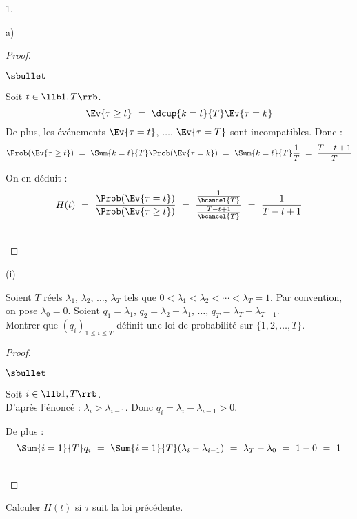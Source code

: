 \documentclass[11pt]{article}%
\begin{document}
\begin{noliste}{1.}
\begin{noliste}{a)}
\begin{proof}
\begin{noliste}{$\sbullet$}
	\item Soit $t\in \llb 1, T\rrb$.
	\[
	  \Ev{\tau \geq t} \ = \ \dcup{k=t}{T} \Ev{\tau =k}
	\]
	De plus, les événements $\Ev{\tau=t}$, $\ldots$, $\Ev{\tau =
	T}$ sont incompatibles. Donc :
	\[
	  \Prob(\Ev{\tau \geq t}) \ = \ \Sum{k=t}{T} 
	  \Prob(\Ev{\tau =k}) \ = \ \Sum{k=t}{T} \dfrac{1}{T}
	  \ = \ \dfrac{T-t+1}{T}
	\]
	
	\item On en déduit :
	\[
	  H(t) \ = \ \dfrac{\Prob(\Ev{\tau =t})}{\Prob(\Ev{\tau \geq 
	  t})} \ = \ \dfrac{\frac{1}{\bcancel{T}}}{\frac{T-t+1}
	  {\bcancel{T}}} \ = \ \dfrac{1}{T-t+1}
	\]
      \end{noliste}
      ~\\[-1cm]
    \end{proof}

    
    \item 
    \begin{nonoliste}{(i)}
      \item Soient $T$ réels $\lambda_1$, $\lambda_2$, $\ldots$, 
      $\lambda_T$ tels que $0 < \lambda_1 < \lambda_2 < \cdots < 
      \lambda_T=1$. Par convention, on pose $\lambda_0=0$. Soient 
      $q_1=\lambda_1$, $q_2=\lambda_2-\lambda_1$, $\ldots$, 
      $q_T=\lambda_T - \lambda_{T-1}$.\\
      Montrer que $(q_i)_{1\leq i \leq T}$ définit une loi de 
      probabilité sur $\{1,2, \ldots, T\}$.
      
      \begin{proof}~
        \begin{noliste}{$\sbullet$}
	  \item Soit $i\in \llb 1, T\rrb$.\\
	  D'après l'énoncé : $\lambda_i > \lambda_{i-1}$. Donc 
	  $q_i = \lambda_i - \lambda_{i-1} >0$.
	  
	  \item De plus :
	  \[
	    \Sum{i=1}{T} q_i \ = \ \Sum{i=1}{T} (\lambda_i - 
	    \lambda_{i-1}) \ = \ \lambda_T - \lambda_0 \ = \ 1-0
	    \ = \ 1
	  \]
        \end{noliste}
        ~\\[-1cm]
      \end{proof}

      
      \item Calculer $H(t)$ si $\tau$ suit la loi précédente.
      

\end{nonoliste}
\end{noliste}
\end{noliste}
\end{document}

